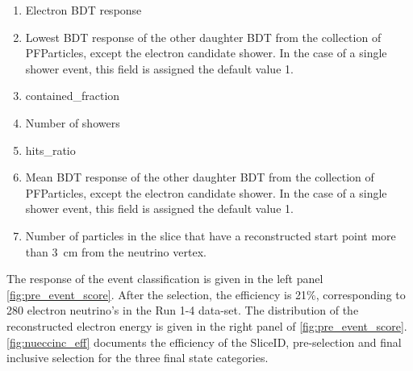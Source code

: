 \begin{enumerate}
    \item Electron BDT response
    \item Lowest BDT response of the other daughter BDT from the collection of PFParticles, except the electron candidate shower. In the case of a single shower event, this field is assigned the default value 1. 
    \item contained\_fraction
    \item Number of showers
    \item hits\_ratio
    \item Mean BDT response of the other daughter BDT from the collection of PFParticles, except the electron candidate shower. In the case of a single shower event, this field is assigned the default value 1. 
    \item Number of particles in the slice that have a reconstructed start point more than \SI{3}{\cm} from the neutrino vertex.
\end{enumerate}
The response of the event classification is given in the left panel \cref{fig:pre_event_score}. After the selection, the efficiency is 21\%, corresponding to 280 electron neutrino's in the Run 1-4 data-set. The distribution of the reconstructed electron energy is given in the right panel of \cref{fig:pre_event_score}. \cref{fig:nueccinc_eff} documents the efficiency of the SliceID, pre-selection and final inclusive selection for the three final state categories.



